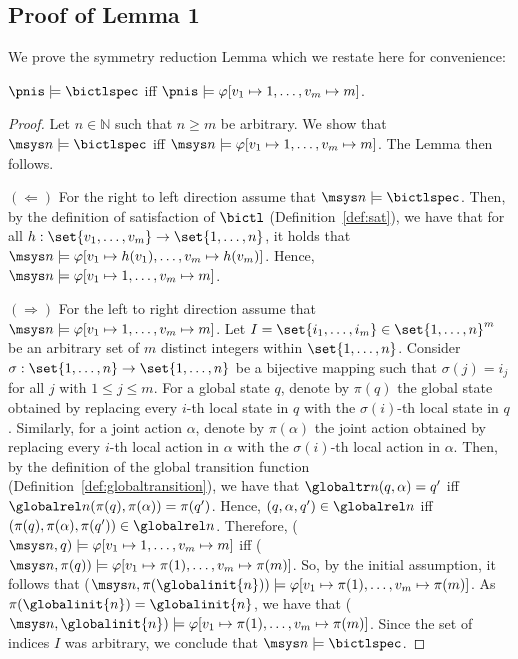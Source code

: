 \subsection*{Proof of Lemma 1} 
We prove the symmetry reduction Lemma which we restate here for convenience:
\begin{customlemma}{1}
$\pnis \models \bictlspec$ iff $\pnis \models \varphi[v_1 \mapsto 1, \ldots, v_m
\mapsto m]$.
\end{customlemma}
\begin{proof}
Let $n \in \mathbb N$ such that $n \geq m$ be arbitrary. We show that $\msys n
\models \bictlspec$ iff $\msys n \models \varphi[v_1 \mapsto 1, \ldots, v_m
\mapsto m]$. The Lemma then follows.

$\boldsymbol{(\Longleftarrow)}$ For the right to left direction assume that $\msys n \models
\bictlspec$. Then, by the definition of satisfaction of $\bictl$
(Definition~\ref{def:sat}), we have that for all $h: \set{v_1, \ldots, v_m}
\rightarrow \set{1,\ldots,n}$,  it holds that $\msys n \models \varphi[v_1
\mapsto h(v_1), \ldots, v_m \mapsto h(v_m)]$.  Hence, $\msys n \models
\varphi[v_1 \mapsto 1, \ldots, v_m \mapsto m]$.


$\boldsymbol{(\Longrightarrow)}$ For the left to right direction assume that $\msys n \models
\varphi[v_1 \mapsto 1, \ldots, v_m \mapsto m]$. Let $I = \set{i_1, \ldots, i_m}
\in \set{1, \ldots, n}^m$ be an arbitrary set of $m$ distinct integers within
$\set{1,\ldots,n}$.  Consider $\sigma : \set{1, \ldots, n} \rightarrow \set{1,
\ldots, n}$ be a bijective mapping such that $\sigma(j) = i_j$ for all $j$ with
$1 \leq j \leq m$. For a global state $q$, denote by $\pi(q)$ the global state
obtained by replacing every $i$-th local state in $q$ with the $\sigma(i)$-th
local state in $q$. Similarly, for a joint action $\alpha$, denote by
$\pi(\alpha)$ the joint action obtained by replacing every $i$-th local action
in $\alpha$ with the $\sigma(i)$-th local action in $\alpha$. Then, by the
definition of the global transition function
(Definition~\ref{def:globaltransition}), we have that $\globaltr n(q, \alpha) =
q'$  iff $\globalrel n(\pi(q), \pi(\alpha)) = \pi(q')$.  Hence,  $(q, \alpha,
q') \in \globalrel n$ iff $(\pi(q), \pi(\alpha), \pi(q')) \in \globalrel n$.
Therefore, ($\msys n, q) \models  \varphi[v_1 \mapsto 1, \ldots, v_m \mapsto m]$
iff ($\msys n, \pi(q)) \models  \varphi[v_1 \mapsto \pi(1), \ldots, v_m \mapsto
\pi(m)]$. So, by the initial assumption,  it follows that ($\msys n,
\pi(\globalinit{n})) \models  \varphi[v_1 \mapsto \pi(1), \ldots, v_m \mapsto
\pi(m)]$. As $\pi(\globalinit{n}) = \globalinit{n}$, we have that ($\msys n,
\globalinit{n}) \models  \varphi[v_1 \mapsto \pi(1), \ldots, v_m \mapsto
\pi(m)]$. Since the set of indices $I$ was arbitrary, we conclude that $\msys n
\models \bictlspec$.  \end{proof}


